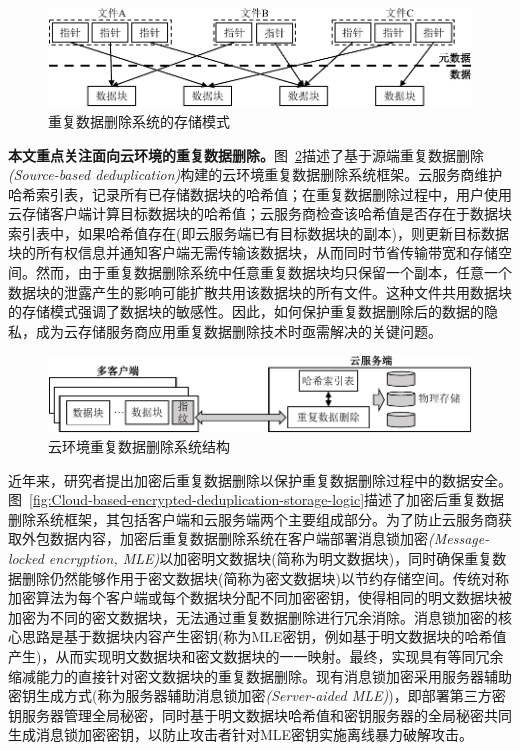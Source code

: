 \begin{figure}[!htb]
    \small
    \centering
    \includegraphics[width=\textwidth]{pic/background/dedupOverview.pdf}
    \caption{重复数据删除系统的存储模式}
    \label{fig:Deduplication-storage-pattern}
\end{figure}

\textbf{本文重点关注面向云环境的重复数据删除。}图~\ref{fig:Cloud-based-deduplication-storage-logic}描述了基于源端重复数据删除\textit{(Source-based deduplication)}构建的云环境重复数据删除系统框架。云服务商维护哈希索引表，记录所有已存储数据块的哈希值；在重复数据删除过程中，用户使用云存储客户端计算目标数据块的哈希值；云服务商检查该哈希值是否存在于数据块索引表中，如果哈希值存在(即云服务端已有目标数据块的副本)，则更新目标数据块的所有权信息并通知客户端无需传输该数据块，从而同时节省传输带宽和存储空间。然而，由于重复数据删除系统中任意重复数据块均只保留一个副本，任意一个数据块的泄露产生的影响可能扩散共用该数据块的所有文件。这种文件共用数据块的存储模式强调了数据块的敏感性。因此，如何保护重复数据删除后的数据的隐私，成为云存储服务商应用重复数据删除技术时亟需解决的关键问题。

\begin{figure}[!htb]
    \small
    \centering
    \includegraphics[width=\textwidth]{pic/background/Cloud-deduplication.pdf}
    \caption{云环境重复数据删除系统结构}
    \label{fig:Cloud-based-deduplication-storage-logic}
\end{figure}
近年来，研究者提出加密后重复数据删除\cite{bellare2013MLE}以保护重复数据删除过程中的数据安全。图~\ref{fig:Cloud-based-encrypted-deduplication-storage-logic}描述了加密后重复数据删除系统框架，其包括客户端和云服务端两个主要组成部分。为了防止云服务商获取外包数据内容，加密后重复数据删除系统在客户端部署消息锁加密\textit{(Message-locked encryption, MLE)}\cite{bellare2013MLE}以加密明文数据块(简称为明文数据块)，同时确保重复数据删除仍然能够作用于密文数据块(简称为密文数据块)以节约存储空间。传统对称加密算法为每个客户端或每个数据块分配不同加密密钥，使得相同的明文数据块被加密为不同的密文数据块，无法通过重复数据删除进行冗余消除。消息锁加密的核心思路是基于数据块内容产生密钥(称为MLE密钥，例如基于明文数据块的哈希值\cite{douceur2002reclaiming}产生)，从而实现明文数据块和密文数据块的一一映射。最终，实现具有等同冗余缩减能力的直接针对密文数据块的重复数据删除。现有消息锁加密采用服务器辅助密钥生成方式(称为服务器辅助消息锁加密\textit{(Server-aided MLE)}\cite{bellare2013DupLESS})，即部署第三方密钥服务器管理全局秘密，同时基于明文数据块哈希值和密钥服务器的全局秘密共同生成消息锁加密密钥，以防止攻击者针对MLE密钥实施离线暴力破解攻击。

